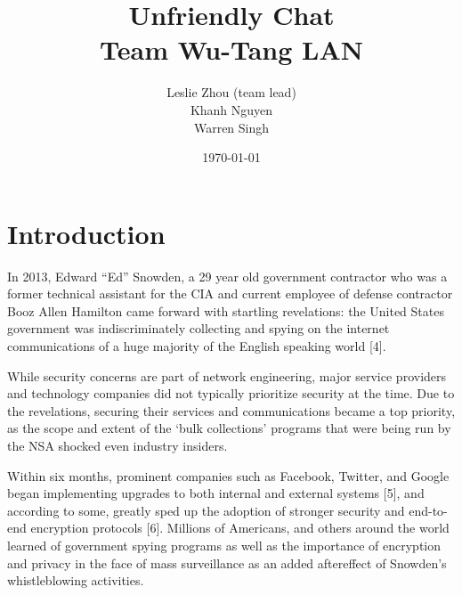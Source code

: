 \documentclass[12pt]{article}
\title{%
    Unfriendly Chat\\
    \large Team Wu-Tang LAN}
\author{Leslie Zhou (team lead)\\ Khanh Nguyen \\ Warren Singh}
\date{\today}
\begin{document}
\maketitle

\newpage
\tableofcontents
\newpage

\section{Introduction}
\par %
\par %
\par %
\par%
In 2013, Edward “Ed” Snowden, a 29 year old government contractor who was a former technical assistant for the CIA and current employee of defense contractor Booz Allen Hamilton came forward with startling revelations: the United States government was indiscriminately collecting and spying on the internet communications of a huge majority of the English speaking world [4].

While security concerns are part of network engineering, major service providers and technology companies did not typically prioritize security at the time. Due to the revelations, securing their services and communications became a top priority, as the scope and extent of the ‘bulk collections’ programs that were being run by the NSA shocked even industry insiders.

Within six months, prominent companies such as Facebook, Twitter, and Google began implementing upgrades to both internal and external systems [5], and according to some, greatly sped up the adoption of stronger security and end-to-end encryption protocols [6]. Millions of Americans, and others around the world learned of government spying programs as well as the importance of encryption and privacy in the face of mass surveillance as an added aftereffect of Snowden’s whistleblowing activities.
\end{document}
